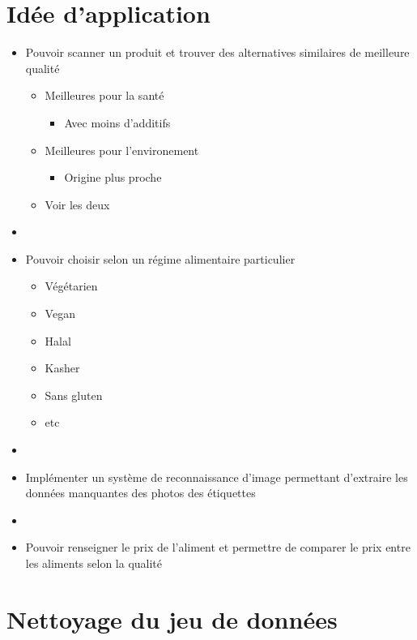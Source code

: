 \section{Idée d'application}
\begin{frame}
  \begin{itemize}
    \item Pouvoir scanner un produit et trouver des alternatives similaires de meilleure qualité
          \begin{itemize}
            \item Meilleures pour la santé
                  \begin{itemize}
                    \item Avec moins d'additifs
                  \end{itemize}
            \item Meilleures pour l'environement
                  \begin{itemize}
                    \item Origine plus proche
                  \end{itemize}
            \item Voir les deux
          \end{itemize}
    \item[]
    \item Pouvoir choisir selon un régime alimentaire particulier
          \begin{itemize}
            \item Végétarien
            \item Vegan
            \item Halal
            \item Kasher
            \item Sans gluten
            \item etc
          \end{itemize}
    \item[]
    \item Implémenter un système de reconnaissance d'image
          permettant d'extraire les données manquantes des photos des étiquettes
    \item[]
    \item Pouvoir renseigner le prix de l'aliment et permettre de comparer le prix
          entre les aliments selon la qualité
  \end{itemize}
\end{frame}

\section{Nettoyage du jeu de données}

